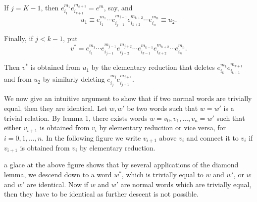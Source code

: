 If $j=K-1$, then $e^{m_1}_{i_1}e^{m_{k+1}}_{i_{k+1}}=e^m$, say, and 
$$
u_1 \equiv e^{m_1}_{i_1}\cdots
e^{m_{j-1}}_{i_{j-1}}e^{m_{k+2}}_{i_{k+2}}\cdots e^{m_n}_{i_n}\equiv
u_2. 
$$

Finally, if $j <k-1$, put
$$
v^*=e^{m_1}_{i_1}\cdots e^{m_{j-1}}_{i_{j-1}}e^{m_{j+2}}_{i_{j+2}}
\cdots e^{m_{k-1}}_{i_{k-1}} e^{m_{k+2}}_{i_{k+2}} \cdots
e^{m_n}_{i_n}. 
$$

Then $v^*$ is obtained from $u_1$ by the elementary reduction that
deletes $e^{m_k}_{i_k}e^{m_{k+1}}_{i_{k+1}}$ and from $u_2$ by
similarly deleting $e^{m_j}_{i_j} e^{m_{j+1}}_{i_{j+1}}$. 

We now give an intuitive argument to show that if two normal words are
trivially equal, then they are identical. Let $w,w'$ be two words such
that $w = w'$ is a trivial relation. By lemma 1, there exists words
$w=v_0,v_1, \ldots, v_n=w'$ such that either $v_{i+1}$ is obtained
from $v_i$ by elementary reduction or vice versa, for $i=0,1, \ldots
,n$. In the following figure we write $v_{i+1}$ above $v_i$ and
connect it to $v_i$ if $v_{i+1}$ is obtained from $v_i$ by elementary
reduction. 

\begin{figure}[H]
\end{figure}
a glace at the above figure shows that by several applications of the
diamond lemma, we descend down to a word $w^*$, which is trivially
equal to $w$ and $w'$, or $w$ and $w'$ are identical. Now if $w$ and
$w'$ are normal words which are trivially equal, then they have to be
identical as further descent is not possible. 

